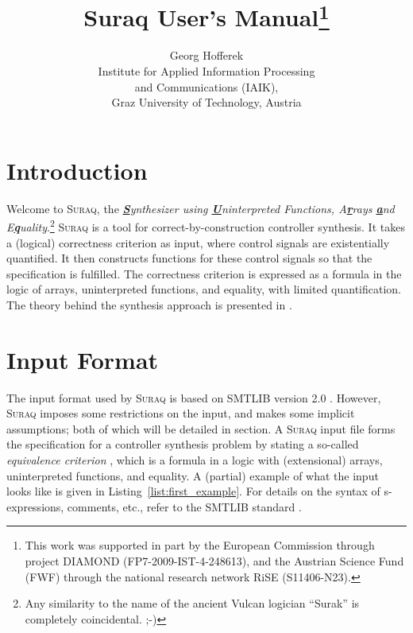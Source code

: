 \documentclass[a4paper]{article}
\newcommand\suraq{\mbox{\textsc{Suraq}}\xspace}
\newcommand\textbful[1]{\textbf{\underline{#1}}}
\begin{document}
\title{Suraq User's Manual\thanks{This work was supported in part by the
European Commission through project DIAMOND (FP7-2009-IST-4-248613),
and the Austrian Science Fund (FWF) through the national research
network RiSE (S11406-N23).}}

\author{Georg Hofferek\\
Institute for Applied Information Processing\\and Communications
(IAIK),\\
Graz University of Technology, Austria}
\date{}
\maketitle
 \vspace{14cm}
 \pagebreak


\section{Introduction} \label{sec:introduction}

Welcome to \suraq, the \emph{\textbful{S}ynthesizer using
\textbful{U}ninterpreted Functions, A\textbful{r}rays \textbful{a}nd
E\textbful{q}uality}.\footnote{Any similarity to the name of the
ancient Vulcan logician ``Surak'' \cite{Memory_Alpha_Surak} is
completely coincidental. ;-)} \suraq is a tool for
correct-by-construction controller synthesis. It takes a (logical)
correctness criterion as input, where control signals are
existentially quantified. It then constructs functions for these
control signals so that the specification is fulfilled. The
correctness criterion is expressed as a formula in the logic of
arrays, uninterpreted functions, and equality, with limited
quantification. The theory behind the synthesis approach is presented
in \cite{Hoffer11}.


\section{Input Format} \label{sec:input_format}

The input format used by \suraq is based on SMTLIB version 2.0
\cite{SMTLIB}. However, \suraq imposes some restrictions on the
input, and makes some implicit assumptions; both of which will be
detailed in section. A \suraq input file forms the specification for
a controller synthesis problem by stating a so-called
\emph{equivalence criterion} \cite{Hoffer11}, which is a formula in a
logic with (extensional) arrays, uninterpreted functions, and
equality. A (partial) example of what the input looks like is given
in Listing~\ref{list:first_example}. For details on the syntax of
s-expressions, comments, etc., refer to the SMTLIB standard
\cite{SMTLIB}.
\end{document}
